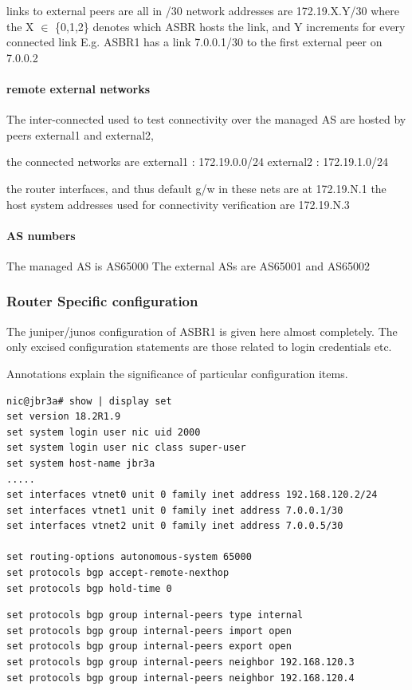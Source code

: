 links to external peers are all in /30
network addresses are 172.19.X.Y/30
where the X $\in$ \{0,1,2\} denotes which ASBR hosts the link, and Y increments for every connected link
E.g. ASBR1 has a link 7.0.0.1/30 to the first external peer on 7.0.0.2

\paragraph{remote external networks}
The inter-connected used to test connectivity over the managed AS are hosted by peers external1 and external2,

the connected networks are
external1 : 172.19.0.0/24
external2 : 172.19.1.0/24

the router interfaces, and thus default g/w in these nets are at 172.19.N.1
the host system addresses used for connectivity verification are 172.19.N.3

\paragraph{AS numbers}
The managed AS is AS65000
The external ASs are AS65001 and AS65002

\subsubsection{Router Specific configuration}

The juniper/junos configuration of ASBR1 is given here almost completely.
The only excised configuration statements are those related to login credentials etc.

Annotations explain the significance of particular configuration items.
\begin{lstlisting}[title=Physical Interfaces and global settings]
nic@jbr3a# show | display set
set version 18.2R1.9
set system login user nic uid 2000
set system login user nic class super-user
set system host-name jbr3a
.....
set interfaces vtnet0 unit 0 family inet address 192.168.120.2/24
set interfaces vtnet1 unit 0 family inet address 7.0.0.1/30
set interfaces vtnet2 unit 0 family inet address 7.0.0.5/30

set routing-options autonomous-system 65000
set protocols bgp accept-remote-nexthop
set protocols bgp hold-time 0
\end{lstlisting}

\begin{lstlisting}[title=IBGP peers - import and export policy are open\, so all known routes are announced]
set protocols bgp group internal-peers type internal
set protocols bgp group internal-peers import open
set protocols bgp group internal-peers export open
set protocols bgp group internal-peers neighbor 192.168.120.3
set protocols bgp group internal-peers neighbor 192.168.120.4
\end{lstlisting}


